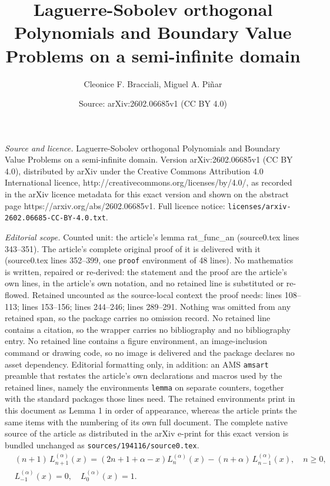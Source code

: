 \documentclass[10pt,a4paper]{amsart}
\title{Laguerre-Sobolev orthogonal Polynomials and Boundary Value Problems on a semi-infinite domain}
\author{Cleonice F. Bracciali, Miguel A. Pi\~nar}
\date{Source: arXiv:2602.06685v1 (CC BY 4.0)}
\begin{document}
\maketitle

\noindent\emph{Source and licence.} Laguerre-Sobolev orthogonal Polynomials and Boundary Value Problems on a semi-infinite domain. Version arXiv:2602.06685v1 (CC BY 4.0), distributed by arXiv under the Creative Commons Attribution 4.0 International licence, http://creativecommons.org/licenses/by/4.0/, as recorded in the arXiv licence metadata for this exact version and shown on the abstract page https://arxiv.org/abs/2602.06685v1. Full licence notice: \texttt{licenses/arxiv-2602.06685-CC-BY-4.0.txt}.\par\smallskip

\noindent\textit{Editorial scope.} Counted unit: the article's lemma rat\_func\_an (source0.tex lines 343--351). The article's complete original proof of it is delivered with it (source0.tex lines 352--399, one \texttt{proof} environment of 48 lines). No mathematics is written, repaired or re-derived: the statement and the proof are the article's own lines, in the article's own notation, and no retained line is substituted or re-flowed.  Retained uncounted as the source-local context the proof needs: lines 108--113; lines 153--156; lines 244--246; lines 289--291.  Nothing was omitted from any retained span, so the package carries no omission record.  No retained line contains a citation, so the wrapper carries no bibliography and no bibliography entry.  No retained line contains a figure environment, an image-inclusion command or drawing code, so no image is delivered and the package declares no asset dependency.  Editorial formatting only, in addition: an AMS \texttt{amsart} preamble that restates the article's own declarations and macros used by the retained lines, namely the environments \texttt{lemma} on separate counters, together with the standard packages those lines need.  The retained environments print in this document as Lemma 1 in order of appearance, whereas the article prints the same items with the numbering of its own full document.  The complete native source of the article as distributed in the arXiv e-print for this exact version is bundled unchanged as \texttt{sources/194116/source0.tex}.
\begin{equation}\label{ttrr}
\begin{aligned}
& (n+1)\,L_{n+1}^{(\alpha)}(x) = (2n+1 + \alpha -x)L_{n}^{(\alpha)}(x) - (n+\alpha) \,L_{n-1}^{(\alpha)}(x), \quad n\geqslant 0,\\
& L_{-1}^{(\alpha)}(x) = 0, \quad L_0^{(\alpha)}(x) = 1.
\end{aligned}
\end{equation}
\end{document}
